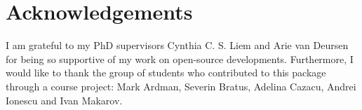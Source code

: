 \documentclass{juliacon}
\begin{document}
\section{Acknowledgements}\label{sec-ack}

I am grateful to my PhD supervisors Cynthia C. S. Liem and Arie van
Deursen for being so supportive of my work on open-source developments.
Furthermore, I would like to thank the group of students who contributed
to this package through a course project: Mark Ardman, Severin Bratus,
Adelina Cazacu, Andrei Ionescu and Ivan Makarov.


\end{document}
